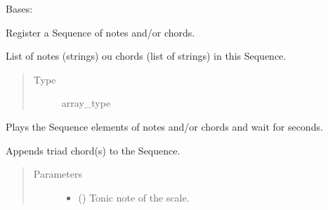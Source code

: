 \documentclass[letterpaper,10pt,english]{sphinxmanual}
\begin{document}
\begin{fulllineitems}
\label{\detokenize{birdears:birdears.sequence.Sequence}}
Bases: 

Register a Sequence of notes and/or chords.

\begin{fulllineitems}
\label{\detokenize{birdears:birdears.sequence.Sequence.elements}}
List of notes (strings) ou chords (list of
strings) in this Sequence.
\begin{quote}\begin{description}
\item[{Type}] \leavevmode
array\_type

\end{description}\end{quote}

\end{fulllineitems}


\begin{fulllineitems}
\label{\detokenize{birdears:birdears.sequence.Sequence.async_play}}
Plays the Sequence elements of notes and/or chords and wait for
 seconds.

\end{fulllineitems}


\begin{fulllineitems}
\label{\detokenize{birdears:birdears.sequence.Sequence.make_chord_progression}}
Appends triad chord(s) to the Sequence.
\begin{quote}\begin{description}
\item[{Parameters}] \leavevmode\begin{itemize}
\item {} 
 () \textendash{} Tonic note of the scale.


\end{itemize}
\end{description}
\end{quote}
\end{fulllineitems}
\end{fulllineitems}
\end{document}
